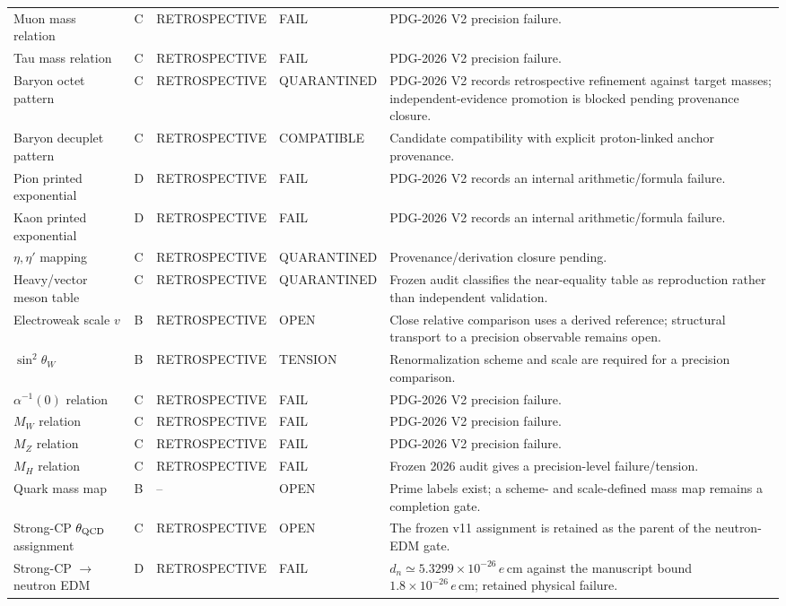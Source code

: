 \documentclass[11pt,a4paper,twoside]{book}
\theoremstyle{definition}
\begin{document}
{\begin{longtable}{p{}p{}p{}p{}p{}}
Muon mass relation & C & RETROSPECTIVE & FAIL & PDG-2026 V2 precision failure. \\
Tau mass relation & C & RETROSPECTIVE & FAIL & PDG-2026 V2 precision failure. \\
\midrule
Baryon octet pattern & C & RETROSPECTIVE & QUARANTINED & PDG-2026 V2 records retrospective refinement against target masses; independent-evidence promotion is blocked pending provenance closure. \\
Baryon decuplet pattern & C & RETROSPECTIVE & COMPATIBLE & Candidate compatibility with explicit proton-linked anchor provenance. \\
Pion printed exponential & D & RETROSPECTIVE & FAIL & PDG-2026 V2 records an internal arithmetic/formula failure. \\
Kaon printed exponential & D & RETROSPECTIVE & FAIL & PDG-2026 V2 records an internal arithmetic/formula failure. \\
$\eta,\eta'$ mapping & C & RETROSPECTIVE & QUARANTINED & Provenance/derivation closure pending. \\
Heavy/vector meson table & C & RETROSPECTIVE & QUARANTINED & Frozen audit classifies the near-equality table as reproduction rather than independent validation. \\
\midrule
Electroweak scale $v$ & B & RETROSPECTIVE & OPEN & Close relative comparison uses a derived reference; structural transport to a precision observable remains open. \\
$\sin^2\theta_W$ & B & RETROSPECTIVE & TENSION & Renormalization scheme and scale are required for a precision comparison. \\
$\alpha^{-1}(0)$ relation & C & RETROSPECTIVE & FAIL & PDG-2026 V2 precision failure. \\
$M_W$ relation & C & RETROSPECTIVE & FAIL & PDG-2026 V2 precision failure. \\
$M_Z$ relation & C & RETROSPECTIVE & FAIL & PDG-2026 V2 precision failure. \\
$M_H$ relation & C & RETROSPECTIVE & FAIL & Frozen 2026 audit gives a precision-level failure/tension. \\
Quark mass map & B & -- & OPEN & Prime labels exist; a scheme- and scale-defined mass map remains a completion gate. \\
\midrule
Strong-CP $\theta_{\rm QCD}$ assignment & C & RETROSPECTIVE & OPEN & The frozen v11 assignment is retained as the parent of the neutron-EDM gate. \\
Strong-CP $\to$ neutron EDM & D & RETROSPECTIVE & FAIL & $d_n\simeq5.3299\times10^{-26}\,e\,\mathrm{cm}$ against the manuscript bound $1.8\times10^{-26}\,e\,\mathrm{cm}$; retained physical failure. \\

\end{longtable}}
\end{document}
